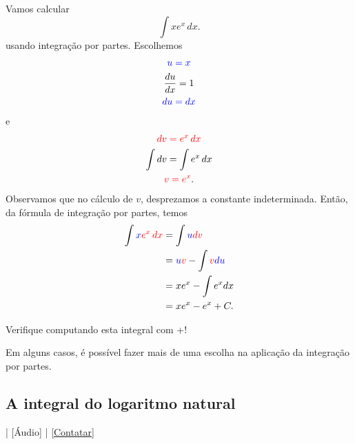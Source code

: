 \begin{ex}
  Vamos calcular
  \begin{equation}
    \int xe^x\,dx.
  \end{equation}
  usando integração por partes. Escolhemos
  \begin{gather}
    {\color{blue}u = x}\\
    \frac{du}{dx} = 1\\
    {\color{blue}du = dx}
  \end{gather}
  e
  \begin{gather}
    {\color{red}dv = e^x\,dx}\\
    \int dv = \int e^x\,dx\\
    {\color{red}v = e^x}.
  \end{gather}
  Observamos que no cálculo de $v$, desprezamos a constante indeterminada. Então, da fórmula de integração por partes, temos
  \begin{align}
    \int {\color{blue}x}{\color{red}e^x\,dx} &= \int {\color{blue}u}{\color{red}dv}\\
                  &= {\color{blue}u}{\color{red}v} - \int {\color{red}v}{\color{blue}du} \\
                  &= xe^x - \int e^xdx \\
                  &= xe^x - e^x + C.
  \end{align}
  
  \ifispython
  Verifique computando esta integral com {\python}+{\sympy}!
  \fi
\end{ex}

Em alguns casos, é possível fazer mais de uma escolha na aplicação da integração por partes.

\subsection{A integral do logaritmo natural}

\begin{flushright}
  [Vídeo] | [Áudio] | \href{https://phkonzen.github.io/notas/contato.html}{[Contatar]}
\end{flushright}

